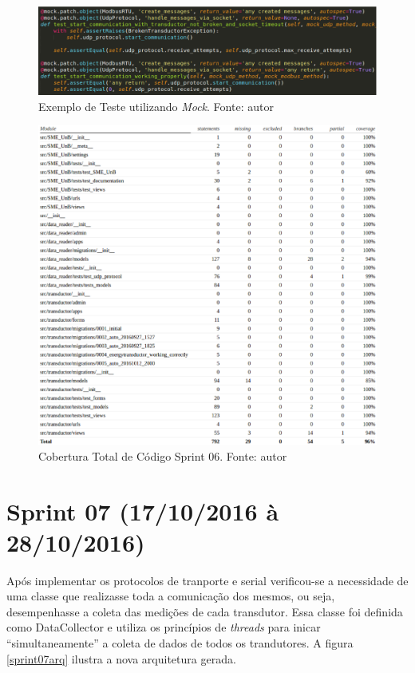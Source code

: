 \begin{figure}[!htpb]
    \centering
    \includegraphics[keepaspectratio=true,scale=0.5]{figuras/exemplo_mock.eps}
    \caption{Exemplo de Teste utilizando \textit{Mock}. Fonte: autor}
    \label{exemplo_mock}
\end{figure}

\begin{figure}[!htpb]
    \centering
    \includegraphics[keepaspectratio=true,scale=0.5]{figuras/cobertura03.eps}
    \caption{Cobertura Total de Código Sprint 06. Fonte: autor}
    \label{cobertura03}
\end{figure}

\section{Sprint 07 (17/10/2016 à 28/10/2016)}
Após implementar os protocolos de tranporte e serial verificou-se a necessidade de uma classe que realizasse toda a comunicação dos mesmos, ou seja, desempenhasse a coleta das medições de cada transdutor. Essa classe foi definida como DataCollector e utiliza os princípios de \textit{threads} para inicar ``simultaneamente'' a coleta de dados de todos os trandutores. A figura \ref{sprint07arq} ilustra a nova arquitetura gerada.


